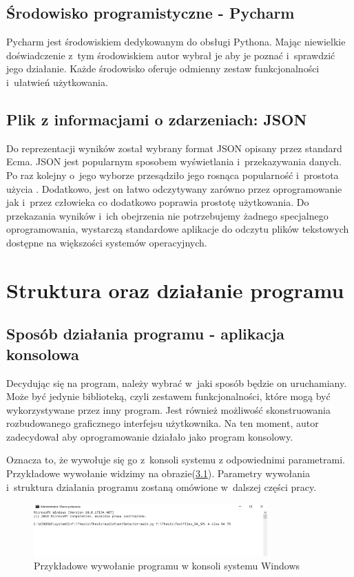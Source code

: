 \documentclass[eng,printmode]{mgr}
\begin{document}
\section{Środowisko programistyczne - Pycharm}
Pycharm jest środowiskiem dedykowanym do obsługi Pythona. Mając niewielkie doświadczenie z~tym środowiskiem autor wybrał je aby je poznać i~sprawdzić jego działanie. Każde środowisko oferuje odmienny zestaw funkcjonalności i~ułatwień użytkowania.

\section{Plik z informacjami o zdarzeniach: JSON}
Do reprezentacji wyników został wybrany format JSON opisany przez standard Ecma\newline\cite{JSON}. JSON jest popularnym sposobem wyświetlania i~przekazywania danych. Po raz kolejny o~jego wyborze przesądziło jego rosnąca popularność i~prostota użycia \cite{JSON_popular}. Dodatkowo, jest on łatwo odczytywany zarówno przez oprogramowanie jak i~przez człowieka co dodatkowo poprawia prostotę użytkowania. Do przekazania wyników i~ich obejrzenia nie potrzebujemy żadnego specjalnego oprogramowania, wystarczą standardowe aplikacje do odczytu plików tekstowych dostępne na większości systemów operacyjnych.
\chapter{Struktura oraz działanie programu}
\section{Sposób działania programu - aplikacja konsolowa}\label{sposób}
Decydując się na program, należy wybrać w~jaki sposób będzie on uruchamiany. Może być jedynie biblioteką, czyli zestawem funkcjonalności, które mogą być wykorzystywane przez inny program. Jest również możliwość skonstruowania rozbudowanego graficznego interfejsu użytkownika. Na ten moment, autor zadecydował aby oprogramowanie działało jako program konsolowy. 

Oznacza to, że wywołuje się go z~konsoli systemu z odpowiednimi parametrami. Przykładowe wywołanie widzimy na obrazie(\ref{wywolanie}). Parametry wywołania i~struktura działania programu zostaną omówione w~dalszej części pracy.
\begin{figure}[hbtp]
\label{wywolanie}
\caption{Przykładowe wywołanie programu w konsoli systemu Windows}
\centering
\includegraphics[width=0.8\textwidth]{cmd_wywolanie.PNG}
\end{figure}
\end{document}
